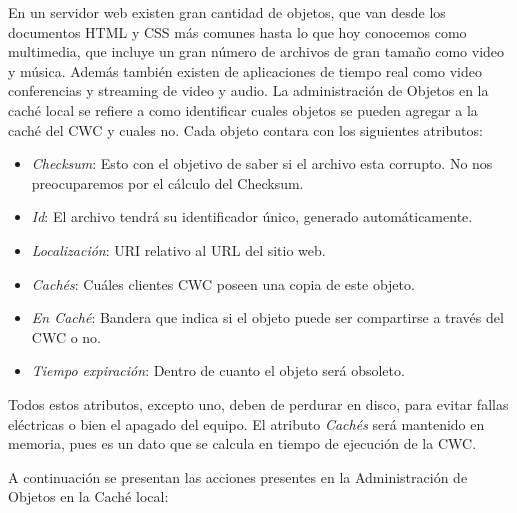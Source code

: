En un servidor web existen gran cantidad de objetos, que van desde los documentos HTML y CSS más comunes hasta lo que hoy conocemos como multimedia, que incluye un gran número de archivos de gran tamaño como video y música. Además también existen de aplicaciones de tiempo real como video conferencias y streaming de video y audio. La administración de Objetos en la caché local se refiere a como identificar cuales objetos se pueden agregar a la caché del CWC y cuales no. Cada objeto contara con los siguientes atributos:

\begin{itemize}
\item \textit{Checksum}: Esto con el objetivo de saber si el archivo esta corrupto. No nos preocuparemos por el cálculo del Checksum.
\item \textit{Id}: El archivo tendrá su identificador único, generado automáticamente.
\item \textit{Localización}: URI relativo al URL del sitio web.
\item \textit{Cachés}: Cuáles clientes CWC poseen una copia de este objeto. 
\item \textit{En Caché}: Bandera que indica si el objeto puede ser compartirse a través del CWC o no.
\item \textit{Tiempo expiración}: Dentro de cuanto el objeto será obsoleto. 
\end{itemize}

Todos estos atributos, excepto uno, deben de perdurar en disco, para evitar fallas eléctricas o bien el apagado del equipo. El atributo \textit{Cachés} será mantenido en memoria, pues es un dato que se calcula en tiempo de ejecución de la CWC.

A continuación se presentan las acciones presentes en la Administración de Objetos en la Caché local:

